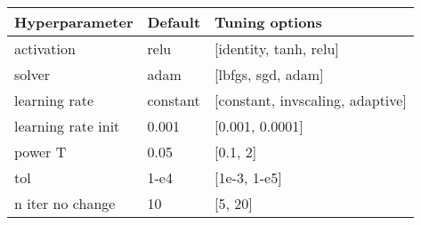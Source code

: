 
\begin{tabular}{|l|l|l|} 
\hline
\textbf{Hyperparameter}& \textbf{Default} & \textbf{Tuning options}\\
\hline
activation & relu & [identity, tanh, relu] \\
\hline
solver & adam & [lbfgs, sgd, adam] \\
\hline
learning rate & constant & [constant, invscaling, adaptive] \\
\hline
learning rate init & 0.001 & [0.001, 0.0001] \\
\hline
power T & 0.05 & [0.1, 2] \\
\hline
tol & 1-e4 & [1e-3, 1-e5] \\
\hline
n iter no change & 10 & [5, 20] \\
\hline
\end{tabular}
